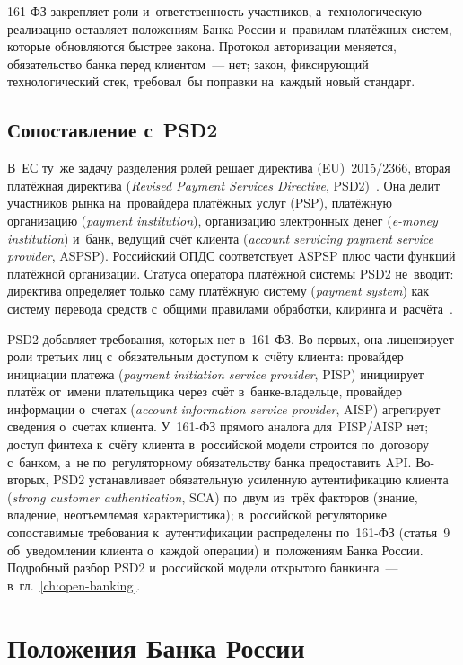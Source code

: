 161-ФЗ закрепляет роли и~ответственность участников, а~технологическую
реализацию оставляет положениям Банка России и~правилам платёжных систем,
которые обновляются быстрее закона. Протокол авторизации меняется,
обязательство банка перед клиентом~--- нет; закон, фиксирующий технологический
стек, требовал~бы поправки на~каждый новый стандарт.

\subsection*{Сопоставление с~PSD2}

В~ЕС ту~же задачу разделения ролей решает директива (EU)~2015/2366, вторая
платёжная директива (\textit{Revised Payment Services
Directive}, PSD2)~\cite{psd2}. Она делит участников рынка на~провайдера
платёжных услуг (PSP), платёжную организацию
(\textit{payment institution}), организацию электронных денег (\textit{e-money
institution}) и~банк, ведущий счёт клиента (\textit{account servicing payment
service provider}, ASPSP). Российский ОПДС соответствует ASPSP плюс части
функций платёжной организации. Статуса оператора платёжной системы PSD2
не~вводит: директива определяет только саму платёжную систему
(\textit{payment system}) как систему перевода средств с~общими правилами
обработки, клиринга и~расчёта~\cite{psd2}.

PSD2 добавляет требования, которых нет в~161-ФЗ. Во-первых, она
лицензирует роли третьих лиц с~обязательным доступом к~счёту клиента:
провайдер инициации платежа (\textit{payment initiation service provider},
PISP) инициирует платёж от~имени плательщика через счёт в~банке-владельце,
провайдер информации о~счетах (\textit{account information service provider},
AISP) агрегирует сведения о~счетах клиента. У~161-ФЗ прямого аналога
для~PISP/AISP нет; доступ финтеха к~счёту клиента в~российской модели
строится по~договору с~банком, а~не по~регуляторному обязательству банка
предоставить API. Во-вторых, PSD2 устанавливает обязательную усиленную
аутентификацию клиента (\textit{strong customer authentication}, SCA)
по~двум из~трёх факторов (знание, владение, неотъемлемая
характеристика); в~российской регуляторике сопоставимые требования
к~аутентификации распределены по~161-ФЗ (статья~9 об~уведомлении
клиента о~каждой операции) и~положениям Банка России. Подробный
разбор PSD2 и~российской модели открытого банкинга~---
в~гл.~\ref{ch:open-banking}.

\section{Положения Банка России}\label{sec:regulation-cbr-provisions}

